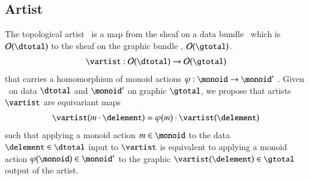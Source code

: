 \documentclass[journal]{vgtc}                %
\begin{document}
\subsection{Artist}
\label{sec:math:artist}
The topological artist \vartist\ is a map from the sheaf on a data bundle \dtotal\ which is $\mathcal{O}(\dtotal)$ to the sheaf on the graphic bundle \gtotal, $\mathcal{O}(\gtotal)$. 
\begin{equation}
    \vartist: \mathcal{O}(\dtotal) \rightarrow \mathcal{O}(\gtotal)
    \label{eq:math:artist:artist}
\end{equation}
that carries a homomorphism of monoid actions $\varphi: \monoid \rightarrow \monoid^{\prime}$ \cite{cegarraCohomologyMonoidsOperators2019}. Given \monoid\ on data $\mathscr{\dtotal}$ and $\monoid^{\prime}$ on graphic $\mathscr{\gtotal}$, we propose that artists $\mathscr{\vartist}$ are equivariant maps 
\begin{equation}
\vartist(m\cdot \delement) = \varphi(m)\cdot \vartist(\delement) 
\end{equation}
such that applying a monoid action $m \in \monoid$ to the data $\delement \in \mathscr{\dtotal}$ input to $\mathscr{\vartist}$ is equivalent to applying a monoid action $\varphi(\monoid) \in \monoid^{\prime}$ to the graphic $\vartist(\delement) \in \mathscr{\gtotal}$ output of the artist.
\end{document}
